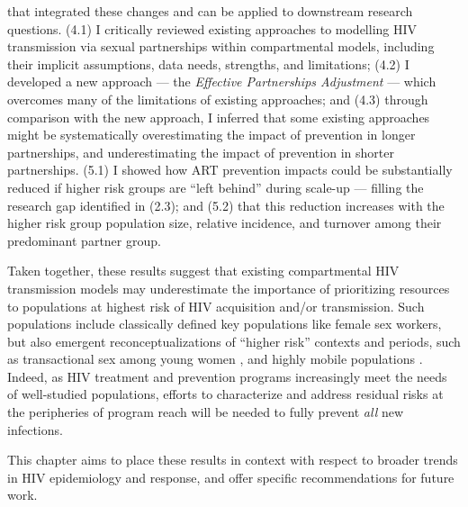 that integrated these changes and can be applied to downstream research questions.
(4.1) I critically reviewed existing approaches to
modelling HIV transmission via sexual partnerships within compartmental models,
including their implicit assumptions, data needs, strengths, and limitations;
(4.2) I developed a new approach --- the \emph{Effective Partnerships Adjustment} ---
which overcomes many of the limitations of existing approaches; and
(4.3) through comparison with the new approach, I inferred that
some existing approaches might be systematically
overestimating the impact of prevention in longer partnerships, and
underestimating the impact of prevention in shorter partnerships.
(5.1) I showed how ART prevention impacts could be substantially reduced
if higher risk groups are ``left behind'' during scale-up
--- \ie filling the research gap identified in (2.3); and
(5.2) that this reduction increases with the higher risk group
population size, relative incidence, and turnover among their predominant partner group.
\par
Taken together, these results suggest that existing compartmental HIV transmission models
may underestimate the importance of prioritizing resources to
populations at highest risk of HIV acquisition and/or transmission.
Such populations include classically defined key populations like female sex workers,
but also emergent reconceptualizations of ``higher risk'' contexts and periods,
such as transactional sex among young women \cite{Wamoyi2016,Cheuk2020},
and highly mobile populations \cite{Akullian2017}.
Indeed, as HIV treatment and prevention programs
increasingly meet the needs of well-studied populations,
efforts to characterize and address residual risks at the peripheries of program reach
will be needed to fully prevent \emph{all} new infections.
\par
This chapter aims to place these results in context with respect to
broader trends in HIV epidemiology and response,
and offer specific recommendations for future work.
